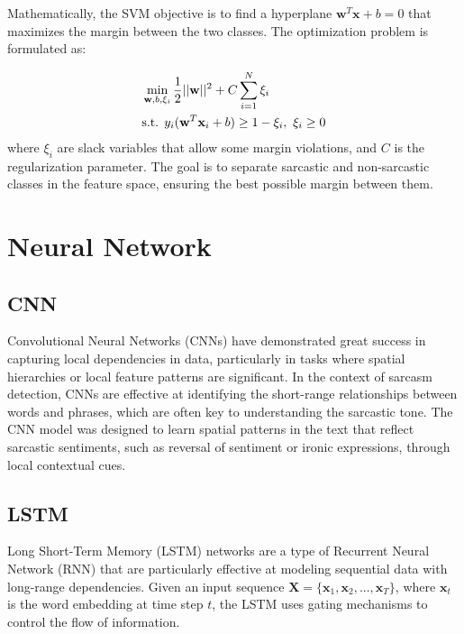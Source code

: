 \documentclass[11pt]{article}
\begin{document}
Mathematically, the SVM objective is to find a hyperplane $\textbf{w}^T\textbf{x}+b=0$ that maximizes the margin between the two classes. The optimization problem is formulated as:

\begin{align}
    &\min_{\textbf{w},b,\xi_i}\frac{1}{2}||\textbf{w}||^2+C\sum_{i=1}^N\xi_i \\
    &\text{s.t. }y_i(\textbf{w}^T\textbf{x}_i+b)\geq 1-\xi_i,\ \xi_i\geq 0 \notag
\end{align}
where $\xi_i$ are slack variables that allow some margin violations, and $C$ is the regularization parameter. The goal is to separate sarcastic and non-sarcastic classes in the feature space, ensuring the best possible margin between them.

\section{Neural Network}
\subsection{CNN}
Convolutional Neural Networks (CNNs) have demonstrated great success in capturing local dependencies in data, particularly in tasks where spatial hierarchies or local feature patterns are significant. In the context of sarcasm detection, CNNs are effective at identifying the short-range relationships between words and phrases, which are often key to understanding the sarcastic tone. The CNN model was designed to learn spatial patterns in the text that reflect sarcastic sentiments, such as reversal of sentiment or ironic expressions, through local contextual cues.

\subsection{LSTM}
Long Short-Term Memory (LSTM) networks are a type of Recurrent Neural Network (RNN) that are particularly effective at modeling sequential data with long-range dependencies.\cite{lstm} Given an input sequence $\textbf{X}=\{\textbf{x}_1,\textbf{x}_2,...,\textbf{x}_T\}$, where $\textbf{x}_t$ is the word embedding at time step $t$, the LSTM uses gating mechanisms to control the flow of information.
\end{document}
